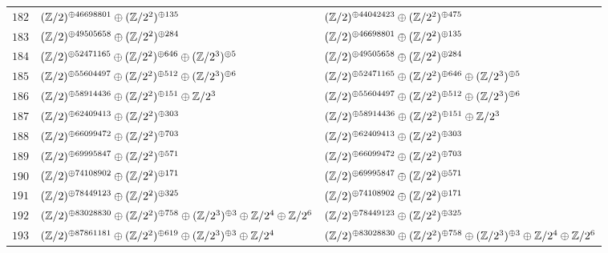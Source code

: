 \begin{supertabular}{|c|p{5.5cm}|p{5.5cm}|}
$182$%
&$(\mathbb{Z}/2)^{\oplus46698801}\oplus(\mathbb{Z}/2^{2})^{\oplus135}$%
&$(\mathbb{Z}/2)^{\oplus44042423}\oplus(\mathbb{Z}/2^{2})^{\oplus475}$\\

$183$%
&$(\mathbb{Z}/2)^{\oplus49505658}\oplus(\mathbb{Z}/2^{2})^{\oplus284}$%
&$(\mathbb{Z}/2)^{\oplus46698801}\oplus(\mathbb{Z}/2^{2})^{\oplus135}$\\

$184$%
&$(\mathbb{Z}/2)^{\oplus52471165}\oplus(\mathbb{Z}/2^{2})^{\oplus646}\oplus(\mathbb{Z}/2^{3})^{\oplus5}$%
&$(\mathbb{Z}/2)^{\oplus49505658}\oplus(\mathbb{Z}/2^{2})^{\oplus284}$\\

$185$%
&$(\mathbb{Z}/2)^{\oplus55604497}\oplus(\mathbb{Z}/2^{2})^{\oplus512}\oplus(\mathbb{Z}/2^{3})^{\oplus6}$%
&$(\mathbb{Z}/2)^{\oplus52471165}\oplus(\mathbb{Z}/2^{2})^{\oplus646}\oplus(\mathbb{Z}/2^{3})^{\oplus5}$\\

$186$%
&$(\mathbb{Z}/2)^{\oplus58914436}\oplus(\mathbb{Z}/2^{2})^{\oplus151}\oplus\mathbb{Z}/2^{3}$%
&$(\mathbb{Z}/2)^{\oplus55604497}\oplus(\mathbb{Z}/2^{2})^{\oplus512}\oplus(\mathbb{Z}/2^{3})^{\oplus6}$\\

$187$%
&$(\mathbb{Z}/2)^{\oplus62409413}\oplus(\mathbb{Z}/2^{2})^{\oplus303}$%
&$(\mathbb{Z}/2)^{\oplus58914436}\oplus(\mathbb{Z}/2^{2})^{\oplus151}\oplus\mathbb{Z}/2^{3}$\\

$188$%
&$(\mathbb{Z}/2)^{\oplus66099472}\oplus(\mathbb{Z}/2^{2})^{\oplus703}$%
&$(\mathbb{Z}/2)^{\oplus62409413}\oplus(\mathbb{Z}/2^{2})^{\oplus303}$\\

$189$%
&$(\mathbb{Z}/2)^{\oplus69995847}\oplus(\mathbb{Z}/2^{2})^{\oplus571}$%
&$(\mathbb{Z}/2)^{\oplus66099472}\oplus(\mathbb{Z}/2^{2})^{\oplus703}$\\

$190$%
&$(\mathbb{Z}/2)^{\oplus74108902}\oplus(\mathbb{Z}/2^{2})^{\oplus171}$%
&$(\mathbb{Z}/2)^{\oplus69995847}\oplus(\mathbb{Z}/2^{2})^{\oplus571}$\\

$191$%
&$(\mathbb{Z}/2)^{\oplus78449123}\oplus(\mathbb{Z}/2^{2})^{\oplus325}$%
&$(\mathbb{Z}/2)^{\oplus74108902}\oplus(\mathbb{Z}/2^{2})^{\oplus171}$\\

$192$%
&$(\mathbb{Z}/2)^{\oplus83028830}\oplus(\mathbb{Z}/2^{2})^{\oplus758}\oplus(\mathbb{Z}/2^{3})^{\oplus3}\oplus\mathbb{Z}/2^{4}\oplus\mathbb{Z}/2^{6}$%
&$(\mathbb{Z}/2)^{\oplus78449123}\oplus(\mathbb{Z}/2^{2})^{\oplus325}$\\

$193$%
&$(\mathbb{Z}/2)^{\oplus87861181}\oplus(\mathbb{Z}/2^{2})^{\oplus619}\oplus(\mathbb{Z}/2^{3})^{\oplus3}\oplus\mathbb{Z}/2^{4}$%
&$(\mathbb{Z}/2)^{\oplus83028830}\oplus(\mathbb{Z}/2^{2})^{\oplus758}\oplus(\mathbb{Z}/2^{3})^{\oplus3}\oplus\mathbb{Z}/2^{4}\oplus\mathbb{Z}/2^{6}$\\


\end{supertabular}
